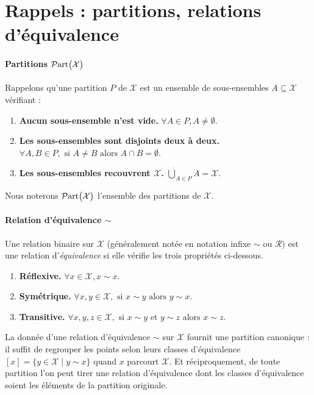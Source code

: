 \section{Rappels : partitions, relations d'équivalence}


\paragraph{Partitions $\mathcal{P}\mathrm{art}\bigl( \mathcal X \bigr)$}

Rappelons qu'une partition $P$ de $\mathcal X$ est un ensemble de sous-ensembles $A \subseteq \mathcal X$ vérifiant :
\begin{enumerate}[label=(\roman*)]
    \item \textbf{Aucun sous-ensemble n'est vide.}  $\forall A \in P, A \neq \emptyset.$
    \item \textbf{Les sous-ensembles sont disjoints deux à deux.} $\forall A, B \in P, \text{ si } A \neq B \text{ alors } A \cap B = \emptyset.$
    \item \textbf{Les sous-ensembles recouvrent $\mathcal X$.}  $\dot\bigcup_{A \in P} A = \mathcal X.$
\end{enumerate}
Nous noterons $\mathcal{P}\mathrm{art}\bigl( \mathcal X \bigr)$ l'ensemble des partitions de $\mathcal X$.

\paragraph{Relation d'équivalence $\sim$}

Une relation binaire sur $\mathcal X$ (généralement notée en notation infixe $\sim$ ou $\mathcal R$) est une relation d'\emph{équivalence} si elle vérifie les trois propriétés ci-dessous.
\begin{enumerate}[label=(\roman*)]
    \item \textbf{Réflexive.} $\forall x \in \mathcal{X}, x \sim x.$
    \item \textbf{Symétrique.} $\forall x, y \in \mathcal{X}, \text{ si } x \sim y \text{ alors } y \sim x.$
    \item \textbf{Transitive.} $\forall x, y, z \in \mathcal{X}, \text{ si } x \sim y \text{ et } y \sim z \text{ alors } x \sim z.$
\end{enumerate}

La donnée d'une relation d'équivalence $\sim$ sur $\mathcal X$ fournit une partition canonique : il suffit de regrouper les points selon leurs classes d'équivalence $[x] = \{y \in \mathcal X \mid y \sim x\}$ quand $x$ parcourt $\mathcal X$.
Et réciproquement, de toute partition l'on peut tirer une relation d'équivalence dont les classes d'équivalence soient les éléments de la partition originale.

